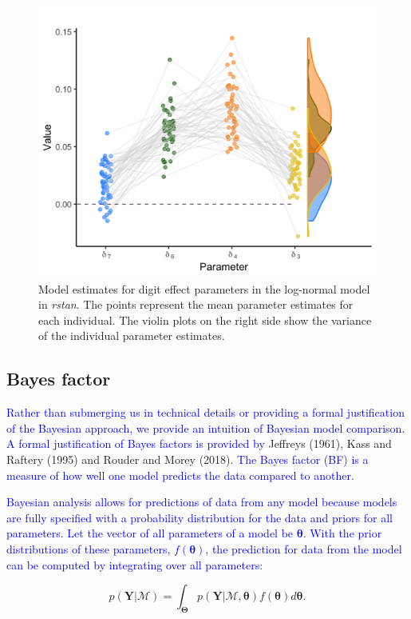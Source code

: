 \documentclass[
  english,
  doc,floatsintext]{apa6}
\begin{document}
\begin{figure}[H]

\includegraphics[width=0.75\linewidth]{I - Images/Fig16_inddiflogplot_onlyrstan_v2} \hfill{}

\caption{Model estimates for digit effect parameters in the log-normal model in \textit{rstan}. The points represent the mean parameter estimates for each individual. The violin plots on the right side show the variance of the individual parameter estimates.}\label{fig:modeldigitestplotlog}
\end{figure}

\hypertarget{bayes-factor}{%
\subsection{Bayes factor}\label{bayes-factor}}

\textcolor{blue}{Rather than submerging us in technical details or providing a formal justification of the Bayesian approach, we provide an intuition of Bayesian model comparison. A formal justification of Bayes factors is provided by} Jeffreys (1961), Kass and Raftery (1995) and Rouder and Morey (2018). \textcolor{blue}{The Bayes factor (BF) is a measure of how well one model predicts the data compared to another.}

\textcolor{blue}{Bayesian analysis allows for predictions of data from any model because models are fully specified with a probability distribution for the data and priors for all parameters. Let the vector of all parameters of a model be $\bm{\theta}$. With the prior distributions of these parameters, $f(\bm{\theta})$, the prediction for data from the model can be computed by integrating over all parameters:}

\begin{equation}
p(\bm{Y} | \mathcal{M}) = \int_{\bm{\Theta}} p(\bm{Y} | \mathcal{M}, \bm{\theta})f(\bm{\theta})d\bm{\theta}. 
\end{equation}
\end{document}
